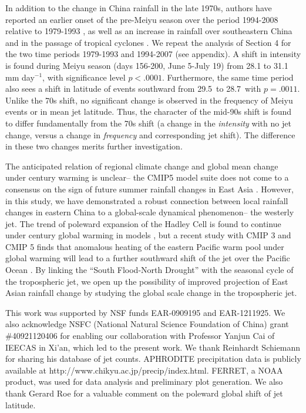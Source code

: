 \documentclass[draft,grl]{AGUTeX}
\begin{document}
\begin{article}
	 In addition to the change in China rainfall in the late 1970s, authors have reported an earlier onset of the pre-Meiyu season over the period 1994-2008 relative to 1979-1993 \citep{Kajikawa2012}, as well as an increase in rainfall over southeastern China and in the passage of tropical cyclones \citep{Kwon2007,Chang2014}. We repeat the analysis of Section 4 for the two time periods 1979-1993 and 1994-2007 (see appendix). A shift in intensity is found during Meiyu season (days 156-200, June 5-July 19) from 28.1 to 31.1 mm day$^{-1}$, with significance level $p<.0001$. Furthermore, the same time period also sees a shift in latitude of events southward from 29.5\textdegree\ to 28.7\textdegree\ with $p=.0011$. Unlike the 70s shift, no significant change is observed in the frequency of Meiyu events or in mean jet latitude. Thus, the character of the mid-90s shift is found to differ fundamentally from the 70s shift (a change in the \textit{intensity} with no jet change, versus a change in \textit{frequency} and corresponding jet shift). The difference in these two changes merits further investigation.

	The anticipated relation of regional climate change and global mean change under  century warming is unclear-- the CMIP5 model suite does not come to a consensus on the sign of future summer rainfall changes in East Asia \citep{Christensen2011}. However, in this study, we have demonstrated a robust connection between local rainfall changes in eastern China to a global-scale dynamical phenomenon-- the westerly jet. The trend of poleward expansion of the Hadley Cell is found to continue under  century global warming in models \citep{Lu2007,Kang2012}, but a recent study with CMIP 3 and CMIP 5 finds that anomalous heating of the eastern Pacific warm pool under global warming will lead to a further southward shift of the jet over the Pacific Ocean \citep{Park2014}. By linking the ``South Flood-North Drought'' with the seasonal cycle of the tropospheric jet, we open up the possibility of improved projection of East Asian rainfall change by studying the global scale change in the tropospheric jet. 



\begin{acknowledgments}
This work was supported by NSF funds EAR-0909195 and EAR-1211925. We also acknowledge NSFC (National Natural Science Foundation of China) grant \#40921120406 for enabling our collaboration with Professor Yanjun Cai of IEECAS in Xi'an, which led to the present work. We thank Reinhardt Schiemann for sharing his database of jet counts. APHRODITE precipitation data is publicly available at http://www.chikyu.ac.jp/precip/index.html. FERRET, a NOAA product, was used for data analysis and preliminary plot generation. We also thank Gerard Roe for a valuable comment on the poleward global shift of jet latitude.
\end{acknowledgments}




%
%
\end{article}
\end{document}
